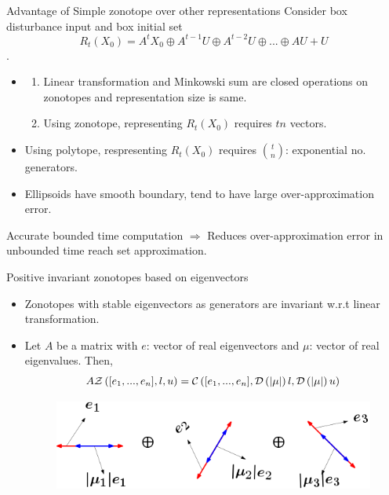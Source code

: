 \begin{frame}{Advantage of Simple zonotope over other representations}
Consider {\color{purple} box disturbance input} and {\color{purple}
box initial set}
%
{\color{purple} \[ R_t(X_0)  = A^tX_0\oplus A^{t-1}U\oplus
A^{t-2}U\oplus ...\oplus AU+U\].}\vspace{-2em}
%
\begin{itemize}
\item
\begin{enumerate}
\item   {\color{blue} Linear transformation} and
{\color{blue} Minkowski sum} are {\color{blue} closed operations on zonotopes} and
{\color{blue} representation size is same}.
\item {\color{blue} Using zonotope}, representing $R_t(X_0)$ requires {\color{blue} $tn$} vectors.
\end{enumerate}
\item {\color{purple} Using polytope}, respresenting $R_t(X_0)$
requires {\color{purple}$t\choose n$: exponential} no. generators.
\item {\color{purple} Ellipsoids have smooth boundary}, tend to have
{\color{purple} large
over-approximation error}.
\end{itemize}
%
{\color{black} Accurate bounded time computation} $\Rightarrow$
{\color{black} Reduces
over-approximation error in unbounded time reach set approximation}.
\end{frame}

%
\begin{frame}{Positive invariant zonotopes based on eigenvectors}
\begin{itemize}
\item {\color{blue}Zonotopes} with {\color{blue} stable eigenvectors as generators} are
{\color{blue} invariant} w.r.t linear transformation.
\item Let {\color{blue} $A$} be a {\color{blue}matrix} with
{\color{blue}$e$: vector of real eigenvectors} and {\color{blue}$\mu$:
vector of real eigenvalues}.  Then,
%
{\color{purple}
\begin{align*}
 A\mathcal{Z}\left([e_1,...,e_n],l,u\right)   = \mathcal{C}\left([e_1,...,e_n],\mathcal{D}\left(\left|\mu\right|\right)l,\mathcal{D}\left(\left|\mu\right|\right)u\right)
\end{align*}
}
%
\begin{figure}
\includegraphics[scale=0.5]{figures/contraction-zonotope.png}
\end{figure}
%
\end{itemize}
\end{frame}

